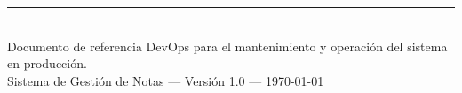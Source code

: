 \documentclass[12pt, a4paper]{article}
\begin{document}
\vfill
\begin{center}
    \rule{0.5\linewidth}{0.4pt}\\[0.3cm]
    {\small Documento de referencia DevOps para el mantenimiento y operación del sistema en producción.}\\[0.2cm]
    {\small Sistema de Gestión de Notas --- Versión 1.0 --- \today}
\end{center}
\end{document}
